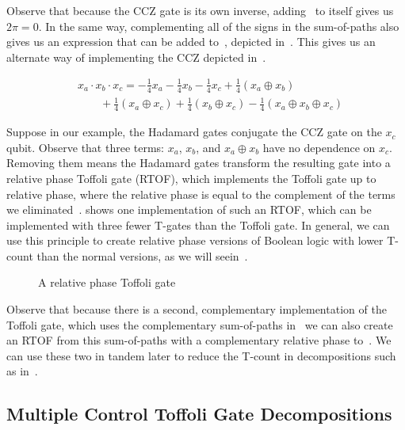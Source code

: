 Observe that because the CCZ gate is its own inverse, adding~ to itself gives us $2\pi = 0$.
In the same way, complementing all of the signs in the sum-of-paths also gives us an expression that can be added
to~, depicted in~. This gives us an alternate way of implementing
the CCZ depicted in~.

\begin{equation}
  \label{eq-toff-bool-alt}
  \begin{aligned}
    &x_a \cdot x_b \cdot x_c = - \frac{1}{4}x_a - \frac{1}{4}x_b - \frac{1}{4}x_c + \frac{1}{4}(x_a \oplus x_b) \\
    &\qquad + \frac{1}{4}(x_a \oplus x_c) + \frac{1}{4}(x_b \oplus x_c) - \frac{1}{4}(x_a \oplus x_b \oplus x_c)
  \end{aligned}
\end{equation}

Suppose in our example, the Hadamard gates conjugate the CCZ gate on the $x_c$ qubit. Observe that three terms:
$x_a$, $x_b$, and $x_a \oplus x_b$ have no dependence on $x_c$. Removing them means the Hadamard gates transform
the resulting gate into a relative phase Toffoli gate (RTOF), which implements the Toffoli gate up to relative
phase, where the relative phase is equal to the complement of the terms we eliminated~\cite{bib-amy-phase-state}.
 shows one implementation of such an RTOF, which can be implemented with three fewer T-gates
than the Toffoli gate. In general, we can use this principle to create relative phase versions of Boolean logic
with lower T-count than the normal versions, as we will seein~.

\begin{figure}
  \scalebox{0.8} {
    
  }
  \caption{A relative phase Toffoli gate}
  \label{fig-rtof}
\end{figure}

Observe that because there is a second, complementary implementation of the Toffoli gate, which uses the
complementary sum-of-paths in~ we can also create an RTOF from this sum-of-paths
with a complementary relative phase to~. We can use these two in tandem later to reduce the
T-count in decompositions such as in~.


\subsection{Multiple Control Toffoli Gate Decompositions}
\label{sub-mct}

